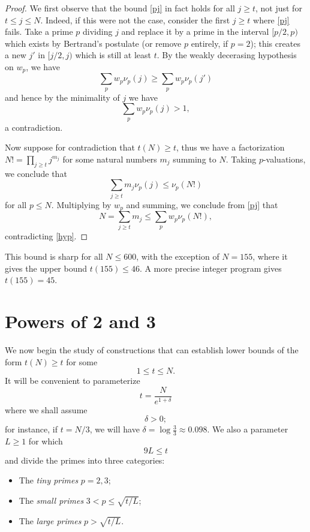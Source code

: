 \documentclass[12pt,a4paper,reqno]{amsart}
\numberwithin{equation}{section}
\theoremstyle{plain}
\theoremstyle{definition}
\begin{document}
\begin{proof}
We first observe that the bound \eqref{pj} in fact holds for all $j \geq t$, not just for $t \leq j \leq N$.  Indeed, if this were not the case, consider the first $j \geq t$ where \eqref{pj} fails.  Take a prime $p$ dividing $j$ and replace it by a prime in the interval $[p/2,p)$ which exists by Bertrand's postulate (or remove $p$ entirely, if $p=2$); this creates a new $j'$ in $[j/2,j)$ which is still at least $t$.  By the weakly decerasing hypothesis on $w_p$, we have
$$ \sum_p w_p \nu_p(j) \geq \sum_p w_p \nu_p(j')$$
and hence by the minimality of $j$ we have
$$ \sum_p w_p \nu_p(j) > 1, $$
a contradiction.

Now suppose for contradiction that $t(N) \geq t$, thus we have a factorization $N! = \prod_{j \geq t} j^{m_j}$ for some natural numbers $m_j$ summing to $N$.  Taking $p$-valuations, we conclude that
$$ \sum_{j \geq t} m_j \nu_p(j) \leq \nu_p(N!)$$
for all $p \leq N$.  Multiplying by $w_p$ and summing, we conclude from \eqref{pj} that
$$ N = \sum_{j \geq t} m_j \leq \sum_p w_p \nu_p(N!),$$
contradicting \eqref{hyp}.
\end{proof}

This bound is sharp for all $N \leq 600$, with the exception of $N=155$, where it gives the upper bound $t(155) \leq 46$.  A more precise integer program gives $t(155) = 45$.

\section{Powers of 2 and 3}

We now begin the study of constructions that can establish lower bounds of the form $t(N) \geq t$ for some 
\begin{equation}\label{tn}
  1 \leq t \leq N.  
\end{equation}
It will be convenient to parameterize
\begin{equation}\label{tparam}
  t = \frac{N}{e^{1+\delta}}
\end{equation}
where we shall assume
\begin{equation}\label{delta-pos}
\delta > 0;
\end{equation}
for instance, if $t=N/3$, we will have $\delta = \log \frac{3}{3} \approx 0.098$.  We also a parameter $L \geq 1$ for which
\begin{equation}\label{tl}
  9L \leq t
\end{equation}
and divide the primes into three categories:
\begin{itemize}
\item The \emph{tiny primes} $p=2,3$;
\item The \emph{small primes} $3 < p \leq \sqrt{t/L}$;
\item The \emph{large primes} $p > \sqrt{t/L}$.
\end{itemize}
\end{document}
